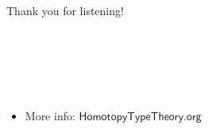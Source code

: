 \documentclass{beamer}
\begin{document}

\begin{frame}{}
	Thank you for listening!
	\ \\ \ \\ \ \\ \ \\ \ \\ \ \\
	\begin{itemize}
	\item More info: $\mathsf{HomotopyTypeTheory.org}$
	\end{itemize}
\end{frame}
\end{document}
